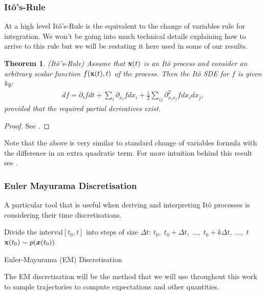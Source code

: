 \documentclass[a4paper,12pt,twoside,openright]{report}
\newtheorem{theorem}{Theorem}
\theoremstyle{definition}
\begin{document}
\subsubsection{Itô's-Rule}

At a high level Itô's-Rule is the equivalent to the change of variables rule for integration. We won't be going into much technical details explaining how to arrive to this rule but we will be restating it here used in some of our results. 

\begin{theorem}
  (Itô's-Rule) Assume that ${\mathbf{x}}(t)$ is an Itô process and consider an arbitrary scalar function $f({\mathbf{x}}(t), t)$ of the process. Then the Itô SDE for $f$ is given by:
  \begin{align}\label{eq:ito_rule}
      df = \partial_t f dt + \sum_i \partial_{{x_i}} f dx_i + \frac{1}{2}\sum_{ij} \partial^2_{{x_i}{x_j}} f dx_i dx_j,
  \end{align}
  provided that the required partial derivatives exist. 
\end{theorem}
\begin{proof}
See \cite{oksendal2003stochastic}.
\end{proof}
Note that the above is very similar to standard change of variables formula with the difference  in an extra quadratic term. For more intuition behind this result see \cite[Chapter~4]{sarkka2019applied}.

\subsubsection{Euler Mayurama Discretisation}

A particular tool that is useful when deriving and interpreting Itô processes is considering their time discretisations.
\begin{algorithm} \label{alg:em}
Divide the interval$[t_0, t]$ into steps of size $\Delta t$: $t_0, \;t_0 + \Delta t,\; \hdots ,\; t_0 + k \Delta t,\; \hdots, \;t$ \\
${\mathbf{x}}(t_0) \sim p({\bm{x}}(t_0))$\\
\caption{Euler-Mayurama (EM) Discretisation }
\end{algorithm}
The EM discretisation will be the method that we will use throughout this work to sample trajectories to compute expectations and other quantities.
\end{document}

